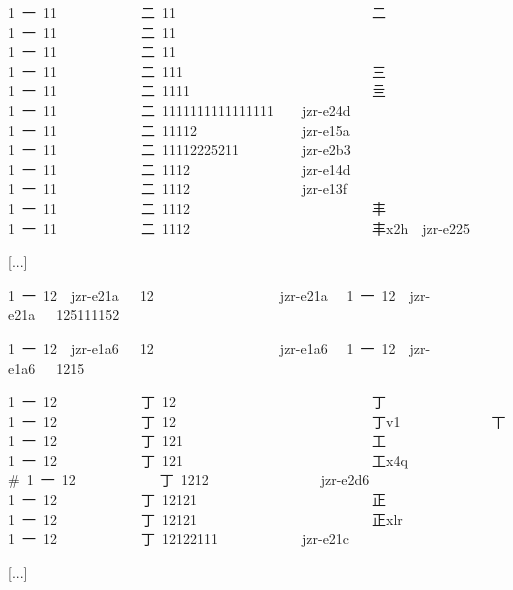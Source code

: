 1 {\cjk{}一} 11            {\cjk{}二} 11                            {\cjk{}二} 
1 {\cjk{}一} 11            {\cjk{}二} 11                            {} 
1 {\cjk{}一} 11            {\cjk{}二} 11                            {} 
1 {\cjk{}一} 11            {\cjk{}二} 111                           {\cjk{}三} 
1 {\cjk{}一} 11            {\cjk{}二} 1111                          {\cjk{}亖} 
1 {\cjk{}一} 11            {\cjk{}二} 1111111111111111    jzr-e24d  {} 
1 {\cjk{}一} 11            {\cjk{}二} 11112               jzr-e15a  {} 
1 {\cjk{}一} 11            {\cjk{}二} 11112225211         jzr-e2b3  {} 
1 {\cjk{}一} 11            {\cjk{}二} 1112                jzr-e14d  {} 
1 {\cjk{}一} 11            {\cjk{}二} 1112                jzr-e13f  {} 
1 {\cjk{}一} 11            {\cjk{}二} 1112                          {\cjk{}丰} 
1 {\cjk{}一} 11            {\cjk{}二} 1112                          {\cjk{}丰}x2h  jzr-e225  {} 
 
[...] 
 
1 {\cjk{}一} 12  jzr-e21a  { }12                  jzr-e21a  {} 
1 {\cjk{}一} 12  jzr-e21a  { }125111152                     {} 
 
1 {\cjk{}一} 12  jzr-e1a6  { }12                  jzr-e1a6  {} 
1 {\cjk{}一} 12  jzr-e1a6  { }1215                          {} 
 
1 {\cjk{}一} 12            {\cjk{}丁} 12                            {\cjk{}丁} 
1 {\cjk{}一} 12            {\cjk{}丁} 12                            {\cjk{}丁}v1             {\cjk{}丅} 
1 {\cjk{}一} 12            {\cjk{}丁} 121                           {\cjk{}工} 
1 {\cjk{}一} 12            {\cjk{}丁} 121                           {\cjk{}工}x4q            {} 
\# 1 {\cjk{}一} 12            {\cjk{}丁} 1212                jzr-e2d6  {} 
1 {\cjk{}一} 12            {\cjk{}丁} 12121                         {\cjk{}正} 
1 {\cjk{}一} 12            {\cjk{}丁} 12121                         {\cjk{}正}xlr            {} 
1 {\cjk{}一} 12            {\cjk{}丁} 12122111            jzr-e21c  {} 
 
[...] 
 
